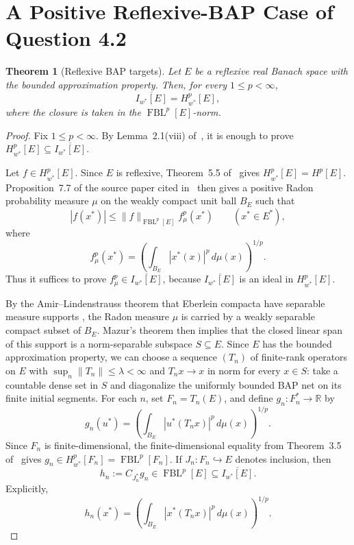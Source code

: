 \documentclass[11pt]{article}
\newtheorem{theorem}{Theorem}
\newcommand{\FBL}{\operatorname{FBL}}
\begin{document}
\section*{A Positive Reflexive-BAP Case of Question 4.2}

\begin{theorem}[Reflexive BAP targets]
\label{thm:reflexive-bap}
Let \(E\) be a reflexive real Banach space with the bounded approximation property.  Then, for every
\(1\leq p<\infty\),
\[
  \overline{I_{w^*}[E]}=H_{w^*}^p[E],
\]
where the closure is taken in the \(\FBL^p[E]\)-norm.
\end{theorem}

\begin{proof}
Fix \(1\leq p<\infty\).  By Lemma~2.1(viii) of~\cite{LT}, it is enough to prove
\(H_{w^*}^p[E]\subseteq \overline{I_{w^*}[E]}\).

Let \(f\in H_{w^*}^p[E]\).  Since \(E\) is reflexive, Theorem~5.5 of~\cite{LT} gives
\(H_{w^*}^p[E]=H^p[E]\).  Proposition~7.7 of the source paper cited in~\cite{LT} then gives a
positive Radon probability measure \(\mu\) on the weakly compact unit ball \(B_E\) such that
\[
  |f(x^*)|\leq \|f\|_{\FBL^p[E]} f_\mu^p(x^*)\qquad (x^*\in E^*),
\]
where
\[
  f_\mu^p(x^*)=\left(\int_{B_E}|x^*(x)|^p\,d\mu(x)\right)^{1/p}.
\]
Thus it suffices to prove \(f_\mu^p\in\overline{I_{w^*}[E]}\), because
\(\overline{I_{w^*}[E]}\) is an ideal in \(H_{w^*}^p[E]\).

By the Amir--Lindenstrauss theorem that Eberlein compacta have separable measure supports
\cite{AL}, the Radon measure \(\mu\) is carried by a weakly separable compact subset of \(B_E\).
Mazur's theorem then implies that the closed linear span of this support is a norm-separable
subspace \(S\subseteq E\).  Since \(E\) has the bounded approximation property, we can
choose a sequence \((T_n)\) of finite-rank operators on \(E\) with
\(\sup_n\|T_n\|\leq \lambda<\infty\) and \(T_nx\to x\) in norm for every \(x\in S\): take a
countable dense set in \(S\) and diagonalize the uniformly bounded BAP net on its finite initial
segments.  For each \(n\), set \(F_n=T_n(E)\), and define
\(g_n:F_n^*\to\mathbb R\)
by
\[
  g_n(u^*)=\left(\int_{B_E}|u^*(T_n x)|^p\,d\mu(x)\right)^{1/p}.
\]
Since \(F_n\) is finite-dimensional, the finite-dimensional equality from
Theorem~3.5 of~\cite{LT} gives \(g_n\in H_{w^*}^p[F_n]=\FBL^p[F_n]\).  If
\(J_n:F_n\hookrightarrow E\) denotes inclusion, then
\[
  h_n:=C_{J_n^*}g_n\in \FBL^p[E]\subseteq \overline{I_{w^*}[E]}.
\]
Explicitly,
\[
  h_n(x^*)=\left(\int_{B_E}|x^*(T_nx)|^p\,d\mu(x)\right)^{1/p}.
\]


\end{proof}
\end{document}
